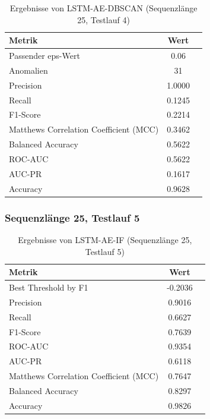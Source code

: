 \documentclass[a4paper,12pt]{article}
\begin{document}
\begin{table}[H]
	\centering
	\caption{Ergebnisse von LSTM-AE-DBSCAN (Sequenzlänge 25, Testlauf 4)}
	\begin{tabular}{lcc}
		\hline
		Metrik & Wert \\
		\hline
		Passender eps-Wert & 0.06 \\
		Anomalien & 31 \\
		Precision & 1.0000 \\
		Recall & 0.1245 \\
		F1-Score & 0.2214 \\
		Matthews Correlation Coefficient (MCC) & 0.3462 \\
		Balanced Accuracy & 0.5622 \\
		ROC-AUC & 0.5622 \\
		AUC-PR & 0.1617 \\
		Accuracy & 0.9628 \\
		\hline
	\end{tabular}
\end{table}

\subsubsection{Sequenzlänge 25, Testlauf 5}
\begin{table}[H]
	\centering
	\caption{Ergebnisse von LSTM-AE-IF (Sequenzlänge 25, Testlauf 5)}
	\begin{tabular}{lcc}
		\hline
		Metrik & Wert \\
		\hline
		Best Threshold by F1 & -0.2036 \\
		Precision & 0.9016 \\
		Recall & 0.6627 \\
		F1-Score & 0.7639 \\
		ROC-AUC & 0.9354 \\
		AUC-PR & 0.6118 \\
		Matthews Correlation Coefficient (MCC) & 0.7647 \\
		Balanced Accuracy & 0.8297 \\
		Accuracy & 0.9826 \\
		\hline
	\end{tabular}
\end{table}
\end{document}
